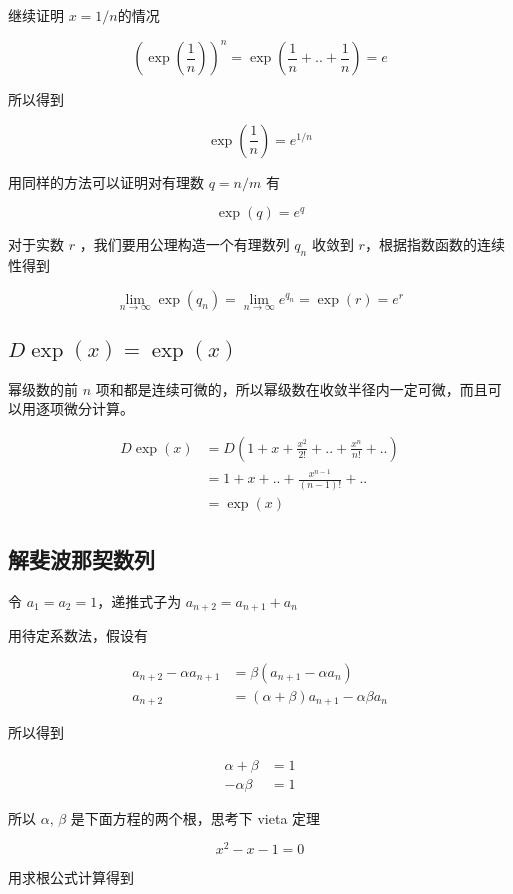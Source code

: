 \documentclass[12pt,a4paper]{ctexart}
\begin{document}
继续证明 $x=1/n$的情况

\[
(\exp(\frac{1}{n}))^n = \exp(\frac{1}{n} + .. + \frac{1}{n}) = e
\]

所以得到

\[
\exp(\frac{1}{n}) = e^{1/n}
\]

用同样的方法可以证明对有理数 $q = n/m$ 有

\[
\exp(q) = e^q
\]

对于实数 $r$ ，我们要用公理构造一个有理数列 $q_n$ 收敛到 $r$，根据指数函数的连续性得到

\[
\lim_{n \to \infty}\exp(q_n) = \lim_{n \to \infty}e^{q_n} = \exp(r) = e^r
\]

\subsection{$D \exp(x) = \exp(x)$}

幂级数的前 $n$ 项和都是连续可微的，所以幂级数在收敛半径内一定可微，而且可以用逐项微分计算。

\begin{align*}
D \exp(x) &= D(1 + x + \frac{x^2}{2!} + .. + \frac{x^n}{n!} + ..) \\
&= 1 + x + .. + \frac{x^{n-1}}{(n-1)!} + ..  \\
&= \exp(x)
\end{align*}

\subsection{解斐波那契数列}

令 $a_1 = a_2 = 1$，递推式子为 $a_{n+2}  = a_{n+1} + a_{n} $

用待定系数法，假设有

\begin{align*}
    a_{n+2} - \alpha a_{n+1} &= \beta(a_{n+1} - \alpha a_{n}) \\
    a_{n+2} &= (\alpha + \beta)a_{n+1} - \alpha \beta a_n
\end{align*}

所以得到

\begin{align*}
    \alpha + \beta &= 1 \\
    -\alpha\beta &= 1
\end{align*}

所以 $\alpha,\, \beta$ 是下面方程的两个根，思考下 vieta 定理

\[
x^2 - x - 1 = 0
\]

用求根公式计算得到
\end{document}
